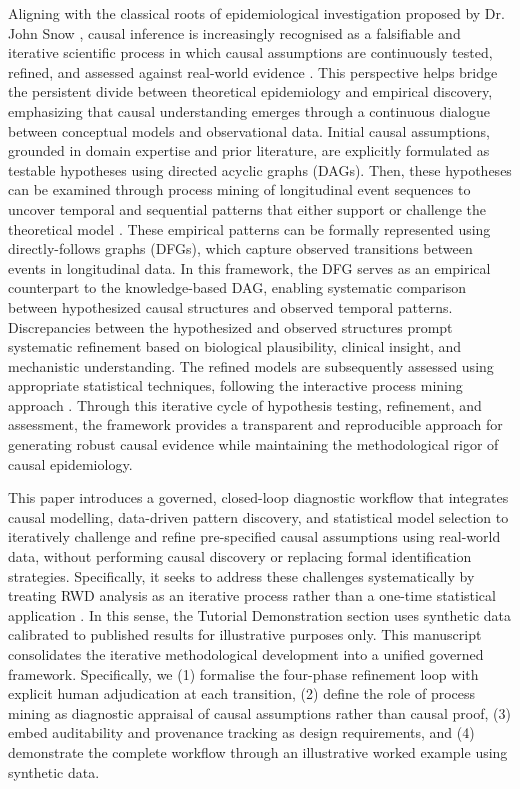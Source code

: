 \documentclass[sn-vancouver-num]{sn-jnl}
\begin{document}
Aligning with the classical roots of epidemiological investigation proposed by Dr. John Snow \citep{coleman2019causality}, causal inference is increasingly recognised as a falsifiable and iterative scientific process in which causal assumptions are continuously tested, refined, and assessed against real-world evidence \citep{ahsen2025}. This perspective helps bridge the persistent divide between theoretical epidemiology and empirical discovery, emphasizing that causal understanding emerges through a continuous dialogue between conceptual models and observational data. Initial causal assumptions, grounded in domain expertise and prior literature, are explicitly formulated as testable hypotheses using directed acyclic graphs (DAGs). Then, these hypotheses can be examined through process mining of longitudinal event sequences to uncover temporal and sequential patterns that either support or challenge the theoretical model \citep{vanderaalst2016}. These empirical patterns can be formally represented using directly-follows graphs (DFGs), which capture observed transitions between events in longitudinal data. In this framework, the DFG serves as an empirical counterpart to the knowledge-based DAG, enabling systematic comparison between hypothesized causal structures and observed temporal patterns. Discrepancies between the hypothesized and observed structures prompt systematic refinement based on biological plausibility, clinical insight, and mechanistic understanding. The refined models are subsequently assessed using appropriate statistical techniques, following the interactive process mining approach \citep{fernandez2020}. Through this iterative cycle of hypothesis testing, refinement, and assessment, the framework provides a transparent and reproducible approach for generating robust causal evidence while maintaining the methodological rigor of causal epidemiology.

This paper introduces a governed, closed-loop diagnostic workflow that integrates causal modelling, data-driven pattern discovery, and statistical model selection to iteratively challenge and refine pre-specified causal assumptions using real-world data, without performing causal discovery or replacing formal identification strategies. Specifically, it seeks to address these challenges systematically by treating RWD analysis as an iterative process rather than a one-time statistical application \citep{ibanez2019}. In this sense, the Tutorial Demonstration section uses synthetic data calibrated to published results for illustrative purposes only. This manuscript consolidates the iterative methodological development into a unified governed framework. Specifically, we (1) formalise the four-phase refinement loop with explicit human adjudication at each transition, (2) define the  role of process mining as diagnostic appraisal of causal assumptions rather than causal proof, (3) embed auditability and provenance tracking as design requirements, and (4) demonstrate the complete workflow through an illustrative worked example using synthetic data.
\end{document}
